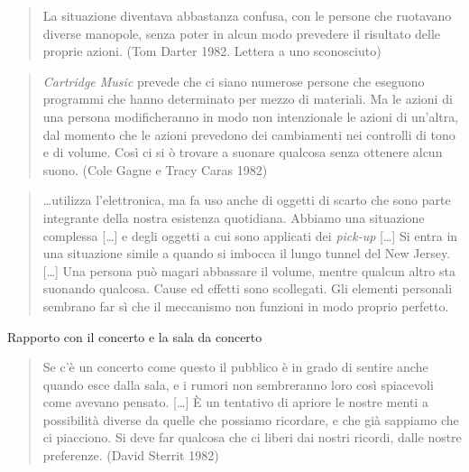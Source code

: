\begin{quote}
	La situazione diventava abbastanza confusa, con le persone che ruotavano diverse manopole, senza poter in alcun modo prevedere il risultato delle proprie azioni. (Tom Darter 1982. Lettera a uno sconosciuto)
\end{quote}

\begin{quote}
	\emph{Cartridge Music} prevede che ci siano numerose persone che eseguono programmi che hanno determinato per mezzo di materiali. Ma le azioni di una persona modificheranno in modo non intenzionale le azioni di un'altra, dal momento che le azioni prevedono dei cambiamenti nei controlli di tono e di volume. Cos\`i ci si \`o trovare a suonare qualcosa senza ottenere alcun suono. (Cole Gagne e Tracy Caras 1982)
\end{quote}

\begin{quote}
	\ldots utilizza l'elettronica, ma fa uso anche di oggetti di scarto che sono parte integrante della nostra esistenza quotidiana. Abbiamo una situazione complessa [\ldots] e degli oggetti a cui sono applicati dei \emph{pick-up} [\ldots] Si entra in una situazione simile a quando si imbocca il lungo tunnel del New Jersey. [\ldots] Una persona può magari abbassare il volume, mentre qualcun altro sta suonando qualcosa. Cause ed effetti sono scollegati. Gli elementi personali sembrano far sì che il meccanismo non funzioni in modo proprio perfetto.
\end{quote}

Rapporto con il concerto e la sala da concerto

\begin{quote}
	Se c'è un concerto come questo il pubblico è in grado di sentire anche quando esce dalla sala, e i rumori non sembreranno loro così spiacevoli come avevano pensato. [\ldots] È un tentativo di apriore le nostre menti a possibilità diverse da quelle che possiamo ricordare, e che già sappiamo che ci piacciono. Si deve far qualcosa che ci liberi dai nostri ricordi, dalle nostre preferenze. (David Sterrit 1982)
\end{quote}

